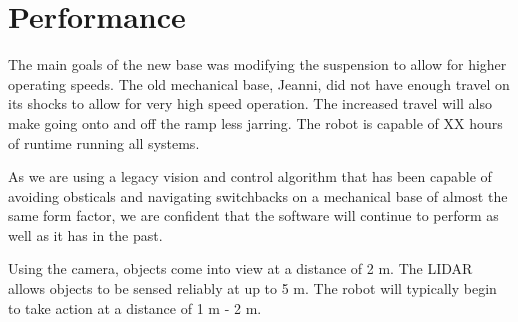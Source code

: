 \section{Performance}

The main goals of the new base was modifying the suspension to allow for higher operating speeds. The old mechanical base, Jeanni, did not have enough travel on its shocks to allow for very high speed operation. The increased travel will also make going onto and off the ramp less jarring. The robot is capable of XX hours of runtime running all systems.

As we are using a legacy vision and control algorithm that has been capable of avoiding obsticals and navigating switchbacks on a mechanical base of almost the same form factor, we are confident that the software will continue to perform as well as it has in the past.

Using the camera, objects come into view at a distance of 2 m. The LIDAR allows objects to be sensed reliably at up to 5 m. The robot will typically begin to take action at a distance of 1 m - 2 m.